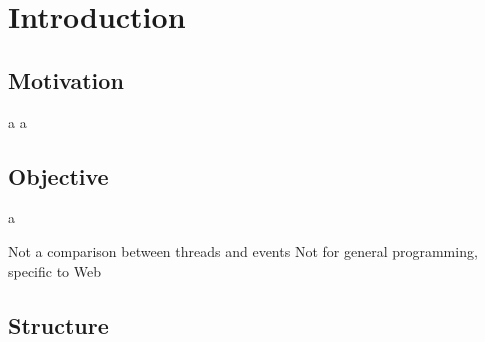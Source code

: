 \chapter{Introduction}

\section{Motivation} \newpage a \newpage a

\section{Objective} \newpage a

Not a comparison between threads and events
Not for general programming, specific to Web


\section{Structure}